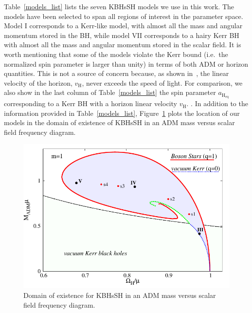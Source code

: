 \documentclass[twocolumn,aps,showpacs,showkeys,prd,superscriptaddress,byrevtex, amsmath]{revtex4-1}
\begin{document}
Table~\ref{models_list} lists the seven KBHsSH models we use in this work. The models have been selected to span all regions of interest in the parameter space. Model I corresponds to a Kerr-like model, with almost all the mass and angular momentum stored in the BH, while model VII corresponds to a hairy Kerr BH with almost all the mass and angular momentum stored in the scalar field. It is worth mentioning that some of the models violate the Kerr bound (i.e.~the normalized spin parameter is larger than unity) in terms of both ADM or horizon quantities. This is not a source of concern because, as shown in~\cite{Herdeiro:2015c}, the linear velocity of the horizon, $v_{\mathrm{H}}$, never exceeds the speed of light. For comparison, we also show in the last column of Table~\ref{models_list} the spin parameter $a_{\mathrm{H_{eq}}}$ corresponding to a Kerr BH with a horizon linear velocity $v_{\mathrm{H}}$. . In addition to the information provided in Table~\ref{models_list}, Figure~\ref{existence} plots the location of our models in  the domain of existence of KBHsSH in an ADM mass versus scalar field frequency diagram.  

\begin{figure}
\centering
\includegraphics[scale=0.7]{figures/existence-eps-converted-to.pdf}
\caption{Domain of existence for KBHsSH in an ADM mass versus scalar
field frequency diagram. }
\label{existence}
\end{figure}
\end{document}
